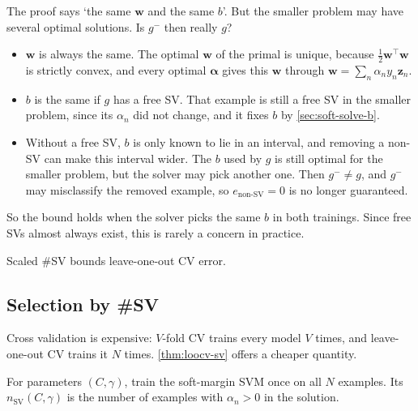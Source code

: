 \begin{remark}
    The proof says `the same \(\bm{w}\) and the same \(b\)'. But the smaller
    problem may have several optimal solutions. Is \(g^-\) then really
    \(g\)?
    \begin{itemize}
        \item \(\bm{w}\) is always the same. The optimal \(\bm{w}\) of the
            primal is unique, because \(\frac{1}{2} \bm{w}^\top \bm{w}\) is
            strictly convex, and every optimal \(\bm{\alpha}\) gives this
            \(\bm{w}\) through \(\bm{w} = \sum_n \alpha_n y_n \bm{z}_n\).
        \item \(b\) is the same if \(g\) has a free SV. That example is
            still a free SV in the smaller problem, since its
            \(\alpha_n\) did not change, and it fixes \(b\) by
            \autoref{sec:soft-solve-b}.
        \item Without a free SV, \(b\) is only known to lie in an interval,
            and removing a non-SV can make this interval wider. The \(b\)
            used by \(g\) is still optimal for the smaller problem, but the
            solver may pick another one. Then \(g^- \ne g\), and \(g^-\) may
            misclassify the removed example, so \(e_{\text{non-SV}} = 0\)
            is no longer guaranteed.
    \end{itemize}
    So the bound holds when the solver picks the same \(b\) in both
    trainings. Since free SVs almost always exist, this is rarely a concern
    in practice.
\end{remark}

\begin{moral}
    Scaled \#SV bounds leave-one-out CV error.
\end{moral}

\subsection{Selection by \texorpdfstring{\#}{\#}SV}

Cross validation is expensive: \(V\)-fold CV trains every model \(V\) times,
and leave-one-out CV trains it \(N\) times. \autoref{thm:loocv-sv} offers a
cheaper quantity.

\begin{definition}
    For parameters \((C, \gamma)\), train the soft-margin SVM once on all
    \(N\) examples. Its 
    \(n_{\mathrm{SV}}(C, \gamma)\) is the number of examples with
    \(\alpha_n > 0\) in the solution.
\end{definition}

